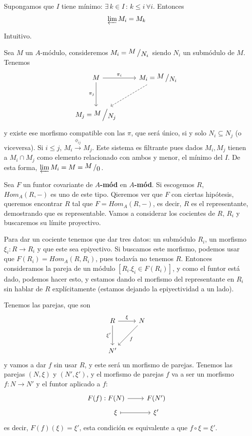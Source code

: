 \begin{prop}
    Supongamos que $I$ tiene m\'inimo: $\exists\, k \in I \, : \, k \leq i \, \forall i$. Entonces 
    $$\varprojlim M_i = M_k$$
\end{prop}
\begin{dem}
    Intuitivo.
\end{dem}
\begin{ejem}
    Sea $M$ un $A$-m\'odulo, consideremos $M_i = \modulo{M}{N_i}$ siendo $N_i$ un subm\'odulo de $M$. Tenemos 
    $$\bt M \arrow[swap]{d}{\pi_j} \rar{\pi_i} & M_i=\modulo{M}{N_i} \arrow[dashed]{dl} \\[5mm]  M_j =\modulo{M}{N_j} \et$$
    y existe ese morfismo compatible con las $\pi$, que ser\'a \'unico, si y solo $N_i \subseteq N_j$ (o viceversa). Si $i \leq j$, $M_i \overset{ \phi_{ij}}{\longrightarrow} M_j$. Este sistema es filtrante pues dados $M_i, M_j$ tienen a $M_i \cap M_j$ como elemento relacionado con ambos y menor, el m\'inimo del $I$. De esta forma, $\varprojlim M_i = M = \modulo{M}{0}$.
\end{ejem}

Sea $F$ un funtor covariante de $A$\textbf{-m\'od} en $A$\textbf{-m\'od}. Si escogemos $R$, $Hom_A(R,-)$ es uno de este tipo. Qieremos ver que $F$ con ciertas hip\'otesis, queremos encontrar $R$ tal que $F=Hom_A(R,-)$, es decir, $R$ es el representante, demostrando que es representable. Vamos a considerar los cocientes de $R$, $R_i$ y buscaremos su l\'imite proyectivo.

Para dar un cociente tenemos que dar tres datos: un subm\'odulo $R_i$, un morfismo $\xi_i: R \longrightarrow R_i$ y que este sea epiyectivo. Si buscamos este morfismo, podemos usar que $F(R_i) = Hom_A(R,R_i)$, pues todav\'ia no tenemos $R$. Entonces consideramos la pareja de un m\'odulo $[R_i. \xi_i \in F(R_i)]$, y como el funtor est\'a dado, podemos hacer esto, y estamos dando el morfismo del representante en $R_i$ sin hablar de $R$ expl\'icitamente (estamos dejando la epiyectividad a un lado).  

Tenemos las parejas, que son 
$$\bt R \rar{\xi} \arrow[swap]{d}{\xi'} & N \arrow{dl}{f} \\[4mm] N' \et$$
y vamos a dar $f$ sin usar $R$, y este ser\'a un morfismo de parejas. Tenemos las parejas $(N,\xi)$ y $(N', \xi')$, y el morfismo de parejas $f$ va a ser un morfismo $f: N \longrightarrow N'$ y el funtor aplicado a $f$: 
$$\bt F(f) : F(N) \rar & F(N') \\[-5mm] \hspace{10mm} \xi\rarmaps & \xi' \et$$
es decir, $F(f)(\xi) = \xi'$, esta condici\'on es equivalente a que $f\circ \xi = \xi'$. 

